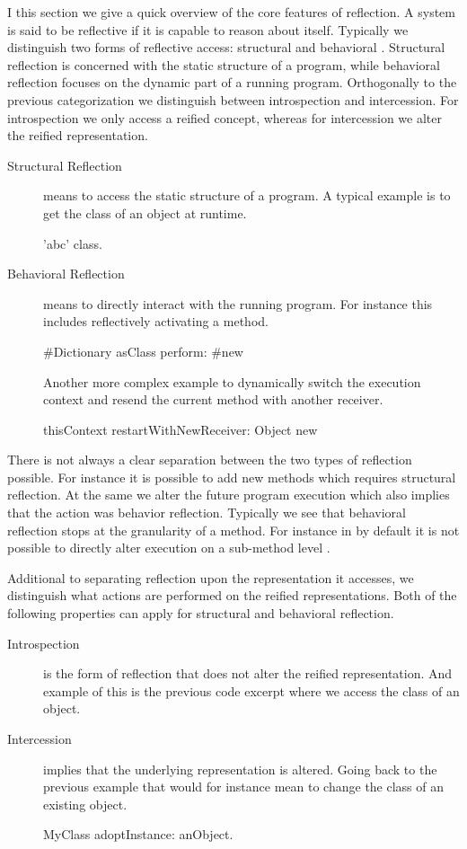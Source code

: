 I this section we give a quick overview of the core features of reflection.
A system is said to be reflective if it is capable to reason about itself.
Typically we distinguish two forms of reflective access: structural and behavioral \cite{Maes87a}.
Structural reflection is concerned with the static structure of a program, while behavioral reflection focuses on the dynamic part of a running program.
Orthogonally to the previous categorization we distinguish between introspection and intercession. 
For introspection we only access a reified concept, whereas for intercession we alter the reified representation.

\begin{description}
\item[Structural Reflection] means to access the static structure of a program.
A typical example is to get the class of an object at runtime.
\begin{stcode}{}
'abc' class.
\end{stcode}

\item[Behavioral Reflection] means to directly interact with the running program.
For instance this includes reflectively activating a method.
\begin{stcode}{}
#Dictionary asClass perform: #new
\end{stcode}
%
Another more complex example to dynamically switch the execution context and resend the current method with another receiver.
\begin{stcode}{}
thisContext restartWithNewReceiver: Object new 
\end{stcode}
\end{description}

\noindent There is not always a clear separation between the two types of reflection possible.
For instance it is possible to add new methods which requires structural reflection.
At the same we alter the future program execution which also implies that the action was behavior reflection.
Typically we see that behavioral reflection stops at the granularity of a method.
For instance in \PH by default it is not possible to directly alter execution on a sub-method level \cite{Denk06a}.

Additional to separating reflection upon the representation it accesses, we distinguish what actions are performed on the reified representations.
Both of the following properties can apply for structural and behavioral reflection.
%
\begin{description}
\item[Introspection] is the form of reflection that does not alter the reified 	representation.
And example of this is the previous code excerpt where we access the class of an object.
	
\item[Intercession] implies that the underlying representation is altered.
Going back to the previous example that would for instance mean to change the class of an existing object.
\begin{stcode}{}
MyClass adoptInstance: anObject.
\end{stcode}
\end{description}
%

